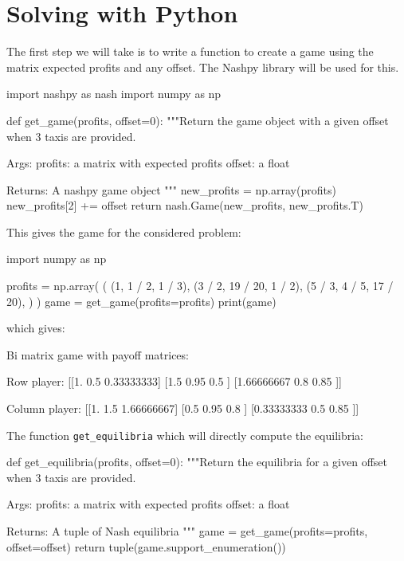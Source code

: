 \section{Solving with Python}\label{sec:solving-with-python}

The first step we will take is to write a function to create a game using the
matrix expected profits and any offset. The Nashpy library will be used for this.

\begin{pyin}
import nashpy as nash
import numpy as np


def get_game(profits, offset=0):
    """Return the game object with a given offset when 3 taxis
    are provided.

    Args:
        profits: a matrix with expected profits
        offset: a float

    Returns:
        A nashpy game object
    """
    new_profits = np.array(profits)
    new_profits[2] += offset
    return nash.Game(new_profits, new_profits.T)
\end{pyin}


This gives the game for the considered problem:

\begin{pyin}
import numpy as np

profits = np.array(
    (
        (1, 1 / 2, 1 / 3),
        (3 / 2, 19 / 20, 1 / 2),
        (5 / 3, 4 / 5, 17 / 20),
    )
)
game = get_game(profits=profits)
print(game)
\end{pyin}

which gives:

\begin{pyout}
Bi matrix game with payoff matrices:

Row player:
[[1.         0.5        0.33333333]
 [1.5        0.95       0.5       ]
 [1.66666667 0.8        0.85      ]]

Column player:
[[1.         1.5        1.66666667]
 [0.5        0.95       0.8       ]
 [0.33333333 0.5        0.85      ]]
\end{pyout}

The function \texttt{get_equilibria} which will directly compute the
equilibria:

\begin{pyin}
def get_equilibria(profits, offset=0):
    """Return the equilibria for a given offset when 3 taxis
    are provided.

    Args:
        profits: a matrix with expected profits
        offset: a float

    Returns:
        A tuple of Nash equilibria
    """
    game = get_game(profits=profits, offset=offset)
    return tuple(game.support_enumeration())
\end{pyin}

